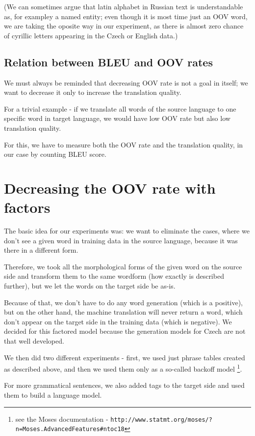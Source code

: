 \documentclass[11pt,letterpaper]{article}
\begin{document}
(We can sometimes argue that latin alphabet in Russian text is understandable as, for exampley a named entity; even though it is most time just an OOV word, we are taking the oposite way in our experiment, as there is almost zero chance of cyrillic letters appearing in the Czech or English data.)

\subsection{Relation between BLEU and OOV rates}
We must always be reminded that decreasing OOV rate is not a goal in itself; we want to decrease it only to increase the translation quality.

For a trivial example - if we translate all words of the source language to one specific word in target language, we would have low OOV rate but also low translation quality.

For this, we have to measure both the OOV rate and the translation quality, in our case by counting BLEU score.


\section{Decreasing the OOV rate with factors}
The basic idea for our experiments was: we want to eliminate the cases, where we don't see a given word in training data in the source language, because it was there in a different form.

Therefore, we took all the morphological forms of the given word on the source side and transform them to the same wordform (how exactly is described further), but we let the words on the target side be as-is.

Because of that, we don't have to do any word generation (which is a positive), but on the other hand, the machine translation will never return a word, which don't appear on the target side in the training data (which is negative). We decided for this factored model because the generation models for Czech are not that well developed.

We then did two different experiments - first, we used just phrase tables created as described above, and then we used them only as a so-called backoff model \footnote{see the Moses documentation - \texttt{http://www.statmt.org/moses/?n=Moses.A\-dva\-nced\-Fea\-tu\-res\#ntoc18}}.

For more grammatical sentences, we also added tags to the target side and used them to build a language model.
\end{document}
